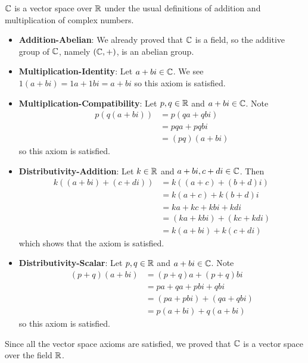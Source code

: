 \begin{example}
    $\mathbb{C}$ is a vector space over $\mathbb{R}$ under the usual definitions of addition and multiplication of complex numbers.
    \begin{itemize}
        \item \textbf{Addition-Abelian}: We already proved that $\mathbb{C}$ is a field, so the additive group of $\mathbb{C}$, namely $(\mathbb{C}, +)$, is an abelian group.
        
        \item \textbf{Multiplication-Identity}: Let $a + bi \in \mathbb{C}$. We see $1(a+bi) = 1a + 1bi = a + bi$ so this axiom is satisfied.

        \item \textbf{Multiplication-Compatibility}: Let $p, q \in \mathbb{R}$ and $a + bi \in \mathbb{C}$. Note
        \begin{align*}
            p(q(a+bi)) &= p(qa + qbi)\\
            &= pqa + pqbi\\
            &= (pq)(a+bi)
        \end{align*}
        so this axiom is satisfied.
        
        \item \textbf{Distributivity-Addition}: Let $k \in \mathbb{R}$ and $a + bi, c + di \in \mathbb{C}$. Then
        \begin{align*}
            k((a+bi) + (c+di)) &= k((a+c) + (b+d)i)\\
            &= k(a+c) + k(b+d)i\\
            &= ka + kc + kbi + kdi\\
            &= (ka + kbi) + (kc + kdi)\\
            &= k(a+bi) + k(c+di)
        \end{align*}
        which shows that the axiom is satisfied.
        
        \item \textbf{Distributivity-Scalar}: Let $p, q \in \mathbb{R}$ and $a + bi \in \mathbb{C}$. Note
        \begin{align*}
            (p+q)(a+bi) &= (p+q)a + (p+q)bi\\
            &= pa + qa + pbi + qbi\\
            &= (pa + pbi) + (qa + qbi)\\
            &= p(a+bi) + q(a+bi)
        \end{align*}
        so this axiom is satisfied.
    \end{itemize}
    
    Since all the vector space axioms are satisfied, we proved that $\mathbb{C}$ is a vector space over the field $\mathbb{R}$.
\end{example}


